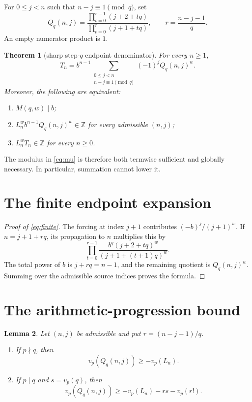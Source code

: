 \documentclass[11pt]{article}
\newtheorem{theorem}{Theorem}
\newtheorem{lemma}[theorem]{Lemma}
\theoremstyle{remark}
\newcommand{\Z}{\mathbb Z}
\begin{document}
For $0\le j<n$ such that $n-j\equiv1\pmod q$, set
\begin{equation}\label{eq:root}
 Q_q(n,j)=
 \frac{\prod_{t=0}^{r-1}(j+2+tq)}
      {\prod_{t=0}^{r}(j+1+tq)},
 \qquad r=\frac{n-j-1}{q}.
\end{equation}
An empty numerator product is $1$.

\begin{theorem}[sharp step-$q$ endpoint denominator]\label{thm:main}
For every $n\ge1$,
\begin{equation}\label{eq:finite}
 T_n=b^{n-1}
 \sum_{\substack{0\le j<n\\n-j\equiv1\pmod q}}
 (-1)^jQ_q(n,j)^w.
\end{equation}
Moreover, the following are equivalent:
\begin{enumerate}
 \item $M(q,w)\mid b$;
 \item $L_n^wb^{n-1}Q_q(n,j)^w\in\Z$ for every admissible $(n,j)$;
 \item $L_n^wT_n\in\Z$ for every $n\ge0$.
\end{enumerate}
\end{theorem}

The modulus in \eqref{eq:mu} is therefore both termwise sufficient and
globally necessary.  In particular, summation cannot lower it.

\section{The finite endpoint expansion}

\begin{proof}[Proof of \eqref{eq:finite}]
The forcing at index $j+1$ contributes $(-b)^j/(j+1)^w$.  If
$n=j+1+rq$, its propagation to $n$ multiplies this by
\[
 \prod_{t=0}^{r-1}
 \frac{b^q(j+2+tq)^w}{(j+1+(t+1)q)^w}.
\]
The total power of $b$ is $j+rq=n-1$, and the remaining quotient is
$Q_q(n,j)^w$.  Summing over the admissible source indices proves the formula.
\end{proof}

\section{The arithmetic-progression bound}

\begin{lemma}\label{lem:valuation}
Let $(n,j)$ be admissible and put $r=(n-j-1)/q$.
\begin{enumerate}
 \item If $p\nmid q$, then
 \begin{equation}\label{eq:outside}
  v_p(Q_q(n,j))\ge-v_p(L_n).
 \end{equation}
 \item If $p\mid q$ and $s=v_p(q)$, then
 \begin{equation}\label{eq:inside}
  v_p(Q_q(n,j))\ge-v_p(L_n)-rs-v_p(r!).
 \end{equation}
\end{enumerate}
\end{lemma}
\end{document}
